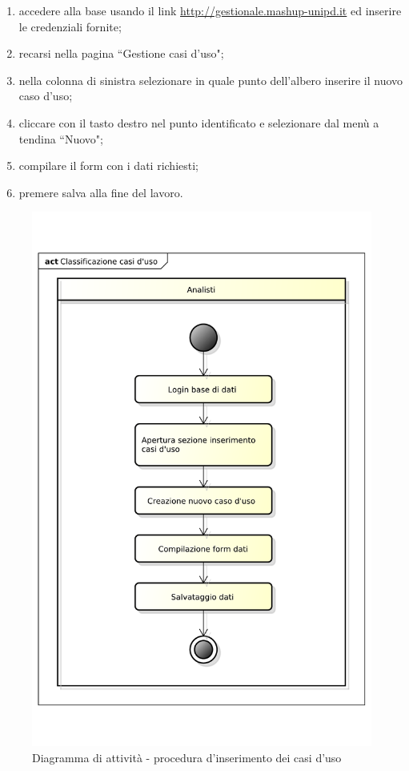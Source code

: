 				\begin{enumerate}
			 		\item accedere alla base usando il link \url{http://gestionale.mashup-unipd.it} ed inserire le credenziali fornite;
			 		\item recarsi nella pagina ``Gestione casi d'uso";
					\item nella colonna di sinistra selezionare in quale punto dell'albero inserire il nuovo caso d'uso;
					\item cliccare con il tasto destro nel punto identificato e selezionare dal menù a tendina ``Nuovo";
					\item compilare il form con i dati richiesti;
					\item premere salva alla fine del lavoro.
			 	\end{enumerate}

			 	\begin{figure}
					\centering
					\includegraphics[scale=0.4]{images/classificazione_uc.pdf}
					\caption{Diagramma di attività - procedura d'inserimento dei casi d'uso}
					\label{fig:procedura_inserimento_uc}
				\end{figure}

